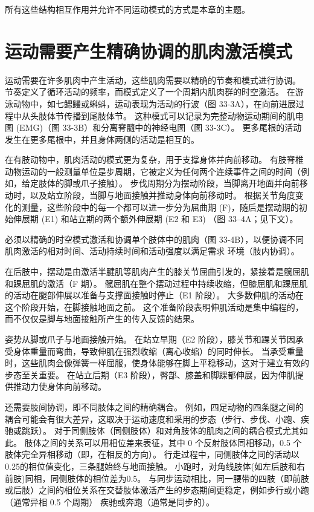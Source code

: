 所有这些结构相互作用并允许不同运动模式的方式是本章的主题。

\section{运动需要产生精确协调的肌肉激活模式}
运动需要在许多肌肉中产生活动，这些肌肉需要以精确的节奏和模式进行协调。 节奏定义了循环活动的频率，而模式定义了一个周期内肌肉群的时空激活。 在游泳动物中，如七鳃鳗或蝌蚪，运动表现为活动的行波（图 33-3A），在向前进展过程中从头肢体节传播到尾肢体节。 这种模式可以记录为完整动物运动期间的肌电图 (EMG)（图 33-3B）和分离脊髓中的神经电图（图 33-3C）。 更多尾根的活动发生在更多尾根中，并且身体两侧的活动是相互的。

在有肢动物中，肌肉活动的模式更为复杂，用于支撑身体并向前移动。 有肢脊椎动物运动的一般测量单位是步周期，它被定义为任何两个连续事件之间的时间（例如，给定肢体的脚或爪子接触）。 步伐周期分为摆动阶段，当脚离开地面并向前移动时，以及站立阶段，当脚与地面接触并推动身体向前移动时。 根据关节角度变化的测量，这些阶段中的每一个都可以进一步分为屈曲期 (F)，随后是摆动期的初始伸展期 (E1) 和站立期的两个额外伸展期 (E2 和 E3) （图 33–4A；见下文）。

必须以精确的时空模式激活和协调单个肢体中的肌肉（图 33-4B），以便协调不同肌肉激活的相对时间、活动持续时间和活动强度以满足需求 环境（肢内协调）。

在后肢中，摆动是由激活半腱肌等肌肉产生的膝关节屈曲引发的，紧接着是髋屈肌和踝屈肌的激活（F 期）。 髋屈肌在整个摆动过程中持续收缩，但膝屈肌和踝屈肌的活动在腿部伸展以准备与支撑面接触时停止（E1 阶段）。 大多数伸肌的活动在这个阶段开始，在脚接触地面之前。 这个准备阶段表明伸肌活动是集中编程的，而不仅仅是脚与地面接触所产生的传入反馈的结果。

姿势从脚或爪子与地面接触开始。 在站立早期（E2 阶段），膝关节和踝关节因承受身体重量而弯曲，导致伸肌在强烈收缩（离心收缩）的同时伸长。 当承受重量时，这些肌肉会像弹簧一样屈服，使身体能够在脚上平稳移动，这对于建立有效的步态至关重要。 在站立后期（E3 阶段），臀部、膝盖和脚踝都伸展，因为伸肌提供推动力使身体向前移动。

还需要肢间协调，即不同肢体之间的精确耦合。 例如，四足动物的四条腿之间的耦合可能会有很大差异，这取决于运动速度和采用的步态（步行、步伐、小跑、疾驰或跳跃）。 对于同侧肢体（同侧肢体）和对角肢体的肌肉之间的耦合模式尤其如此。 肢体之间的关系可以用相位差来表征，其中 0 个反射肢体同相移动，0.5 个肢体完全异相移动（即，在相反的方向）。 行走过程中，同侧肢体之间的活动以0.25的相位值变化，三条腿始终与地面接触。 小跑时，对角线肢体(如左后肢和右前肢)同相，同侧肢体的相位差为0.5。 与同步运动相比，同一腰带的四肢（即前肢或后肢）之间的相位关系在交替肢体激活产生的步态期间更稳定，例如步行或小跑（通常异相 0.5 个周期） 疾驰或奔跑（通常是同步的）。


